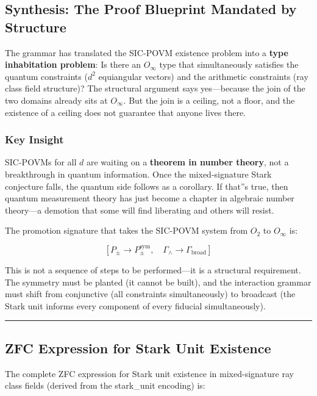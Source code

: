 \documentclass[12pt,a4paper]{article}
\begin{document}
\subsection{Synthesis: The Proof Blueprint Mandated by Structure}

The grammar has translated the SIC-POVM existence problem into a \textbf{type inhabitation problem}: Is there an $O_{\infty}$ type that simultaneously satisfies the quantum constraints ($d^2$ equiangular vectors) and the arithmetic constraints (ray class field structure)? The structural argument says yes---because the join of the two domains already sits at $O_{\infty}$. But the join is a ceiling, not a floor, and the existence of a ceiling does not guarantee that anyone lives there.

\subsubsection{Key Insight}

SIC-POVMs for all $d$ are waiting on a \textbf{theorem in number theory}, not a breakthrough in quantum information. Once the mixed-signature Stark conjecture falls, the quantum side follows as a corollary. If that''s true, then quantum measurement theory has just become a chapter in algebraic number theory---a demotion that some will find liberating and others will resist.

The promotion signature that takes the SIC-POVM system from $O_2$ to $O_{\infty}$ is:

\[[P_{\pm} \rightarrow P_{\pm}^{\text{sym}},\quad \Gamma_{\wedge} \rightarrow \Gamma_{\text{broad}}]\]

This is not a sequence of steps to be performed---it is a structural requirement. The symmetry must be planted (it cannot be built), and the interaction grammar must shift from conjunctive (all constraints simultaneously) to broadcast (the Stark unit informs every component of every fiducial simultaneously).

\begin{center}
\rule{0.5\textwidth}{0.4pt}
\end{center}

\subsection{ZFC Expression for Stark Unit Existence}

The complete ZFC expression for Stark unit existence in mixed-signature ray class fields (derived from the stark\_unit encoding) is:
\end{document}
